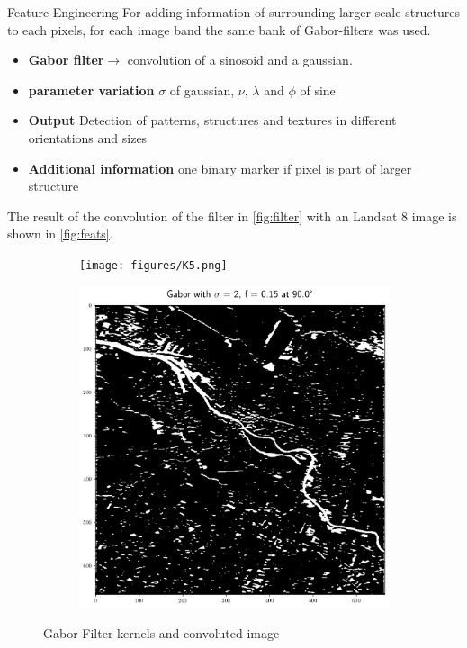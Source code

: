 \documentclass[final,20pt]{beamer}
\newlength{\colwidth}
\begin{document}
\begin{frame}[t]
\begin{columns}[t]
\begin{column}{\colwidth}
  \begin{block}{Feature Engineering}
  For adding information of surrounding larger scale structures to each pixels, for each image band the same bank of Gabor-filters was used. 
  \begin{itemize}
          \setlength\itemsep{0.5em}
    \item \textbf{Gabor filter}$\rightarrow$ convolution of a sinosoid and a gaussian.
    \item \textbf{parameter variation} $\sigma$ of gaussian, $\nu$, $\lambda$ and $\phi$ of sine
    \item \textbf{Output} Detection of patterns, structures and textures in different orientations and sizes
    \item \textbf{Additional information} one binary marker if pixel is part of larger structure
  \end{itemize}
  The result of the convolution of the filter in \cref{fig:filter} with an Landsat 8 image is shown in \cref{fig:feats}. \\ 
     \begin{figure}
       \begin{subfigure}{0.47\linewidth}
      \centering
      \texttt{[image: figures/K5.png]}
    \end{subfigure}
    \begin{subfigure}{0.47\linewidth}
      \centering
      \includegraphics[width=0.85\linewidth]{figures/Features_2_015_90.png}
    \end{subfigure}
    \vspace{-0.4em}
    \caption{Gabor Filter kernels and convoluted image}
    \end{figure}
  \end{block}


\end{column}
\end{columns}
\end{frame}
\end{document}
